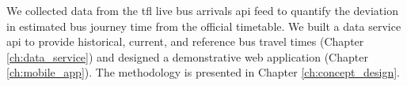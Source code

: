 \par We collected data from the \acrshort{tfl} live bus arrivals \acrshort{api} feed to quantify the deviation in estimated bus journey time from the official timetable. We built a data service \acrshort{api} to provide historical, current, and reference bus travel times (Chapter \ref{ch:data_service}) and designed a demonstrative web application (Chapter \ref{ch:mobile_app}). The methodology is presented in Chapter \ref{ch:concept_design}.



